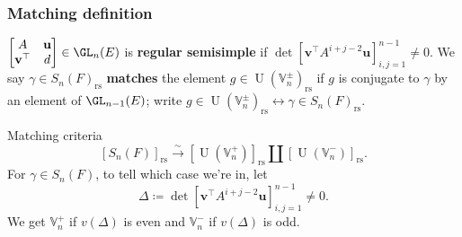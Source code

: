 \documentclass[11pt]{beamer}
\DeclareMathOperator{\Orb}{Orb}
\DeclareMathOperator{\U}{U}
\newcommand{\HH}{\mathcal{H}}
\newcommand{\VV}{\mathbb{V}}
\newcommand{\rs}{_{\text{rs}}}
\newcommand{\uu}{\mathbf{u}}
\newcommand{\vv}{\mathbf{v}}
\begin{document}
\begin{frame}
  \frametitle{Matching definition}
  \begin{definition}
  $\begin{bmatrix} A & \uu \\ \vv^\top & d \end{bmatrix} \in \GL_n(E)$
  is \textbf{regular semisimple} if
  $\det \left[ \vv^\top A^{i+j-2} \uu \right]_{i,j=1}^{n-1} \neq 0$.
  We say $\gamma \in S_n(F)\rs$ \textbf{matches} the element $g \in \U(\VV_n^\pm)\rs$
  if $g$ is conjugate to $\gamma$ by an element of $\GL_{n-1}(E)$; write
  $g \in \U(\VV_n^\pm)\rs \longleftrightarrow \gamma \in S_n(F)\rs$.
  \end{definition}
  \begin{block}{Matching criteria}
    \[ [S_n(F)]\rs \xrightarrow{\sim} [\U(\VV_n^+)]\rs \amalg [\U(\VV_n^-)]\rs. \]
    For $\gamma \in S_n(F)$, to tell which case we're in, let
    \[ \Delta \coloneqq \det \left[ \vv^\top A^{i+j-2} \uu \right]_{i,j=1}^{n-1} \neq 0. \]
    We get $\VV_n^+$ if $v(\Delta)$ is even
    and $\VV_n^-$ if $v(\Delta)$ is odd.
  \end{block}
\end{frame}

\end{document}
